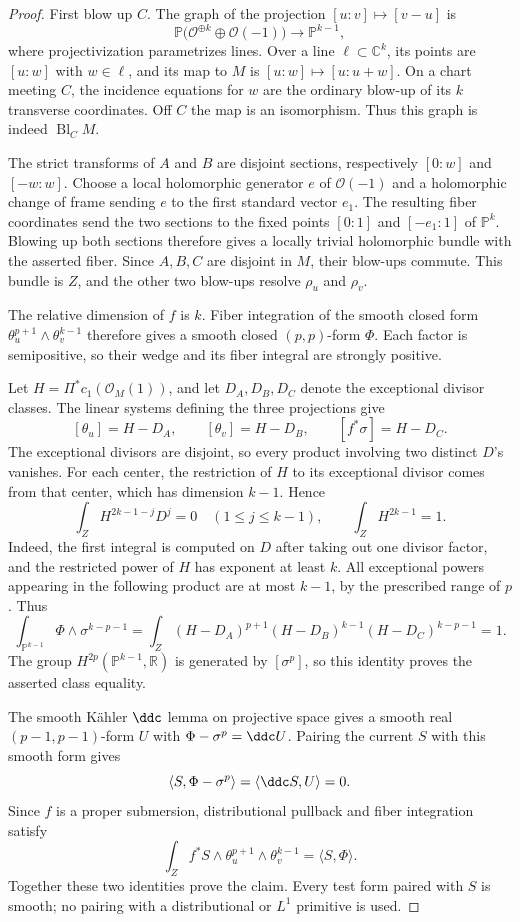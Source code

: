 \begin{proof}
First blow up $C$. The graph of the projection $[u:v]\mapsto[v-u]$ is
\[
 \mathbb P\bigl(\mathcal O^{\oplus k}\oplus\mathcal O(-1)\bigr)
 \longrightarrow\mathbb P^{k-1},
\]
where projectivization parametrizes lines. Over a line $\ell\subset\mathbb C^k$, its points are $[u:w]$ with $w\in\ell$, and its map to $M$ is $[u:w]\mapsto[u:u+w]$. On a chart meeting $C$, the incidence equations for $w$ are the ordinary blow-up of its $k$ transverse coordinates. Off $C$ the map is an isomorphism. Thus this graph is indeed $\operatorname{Bl}_C M$.

The strict transforms of $A$ and $B$ are disjoint sections, respectively $[0:w]$ and $[-w:w]$. Choose a local holomorphic generator $e$ of $\mathcal O(-1)$ and a holomorphic change of frame sending $e$ to the first standard vector $e_1$. The resulting fiber coordinates send the two sections to the fixed points $[0:1]$ and $[-e_1:1]$ of $\mathbb P^k$. Blowing up both sections therefore gives a locally trivial holomorphic bundle with the asserted fiber. Since $A,B,C$ are disjoint in $M$, their blow-ups commute. This bundle is $Z$, and the other two blow-ups resolve $\rho_u$ and $\rho_v$.

The relative dimension of $f$ is $k$. Fiber integration of the smooth closed form $\theta_u^{p+1}\wedge\theta_v^{k-1}$ therefore gives a smooth closed $(p,p)$-form $\Phi$. Each factor is semipositive, so their wedge and its fiber integral are strongly positive.

Let $H=\Pi^*c_1(\mathcal O_M(1))$, and let $D_A,D_B,D_C$ denote the exceptional divisor classes. The linear systems defining the three projections give
\[
 [\theta_u]=H-D_A,\qquad [\theta_v]=H-D_B,
 \qquad [f^*\sigma]=H-D_C.
\]
The exceptional divisors are disjoint, so every product involving two distinct $D$'s vanishes. For each center, the restriction of $H$ to its exceptional divisor comes from that center, which has dimension $k-1$. Hence
\[
 \int_Z H^{2k-1-j}D^j=0\quad(1\leq j\leq k-1),
 \qquad \int_Z H^{2k-1}=1.
\]
Indeed, the first integral is computed on $D$ after taking out one divisor factor, and the restricted power of $H$ has exponent at least $k$. All exceptional powers appearing in the following product are at most $k-1$, by the prescribed range of $p$. Thus
\[
 \int_{\mathbb P^{k-1}}\Phi\wedge\sigma^{k-p-1}
 =\int_Z(H-D_A)^{p+1}(H-D_B)^{k-1}(H-D_C)^{k-p-1}=1.
\]
The group $H^{2p}(\mathbb P^{k-1},\mathbb R)$ is generated by $[\sigma^p]$, so this identity proves the asserted class equality.

The smooth K\"ahler $\ddc$ lemma on projective space gives a smooth real $(p-1,p-1)$-form $U$ with $\Phi-\sigma^p=\ddc U$. Pairing the current $S$ with this smooth form gives
\[
 \langle S,\Phi-\sigma^p\rangle=\langle\ddc S,U\rangle=0.
\]
Since $f$ is a proper submersion, distributional pullback and fiber integration satisfy
\[
 \int_Z f^*S\wedge\theta_u^{p+1}\wedge\theta_v^{k-1}
 =\langle S,\Phi\rangle.
\]
Together these two identities prove the claim. Every test form paired with $S$ is smooth; no pairing with a distributional or $L^1$ primitive is used.
\end{proof}
